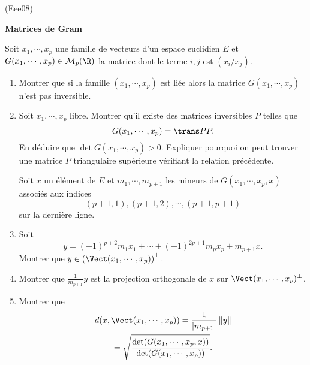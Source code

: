 \begin{tiny}(Eee08)\end{tiny}
\textbf{Matrices de Gram} \par \noindent
Soit $x_{1},\cdots ,x_{p}$ une famille de vecteurs d'un espace euclidien $E$
et $G(x_{1},\cdots ,x_{p})\in \mathcal{M}_{p}(\R)$ la matrice dont
le terme $i,j$ est $(x_{i}/ x_{j})$.
\begin{enumerate}
\item  Montrer que si la famille $(x_{1},\cdots ,x_{p})$ est li{\'e}e alors la matrice  $G(x_{1},\cdots ,x_{p})$ n'est pas inversible.

\item Soit $x_{1},\cdots ,x_{p}$ libre. Montrer qu'il existe des matrices inversibles $P$ telles que
\[
G(x_{1},\cdots ,x_{p}) = \trans P P.
\]
En déduire que $\det G(x_{1},\cdots ,x_{p})>0$. Expliquer pourquoi on peut trouver une matrice $P$ triangulaire supérieure vérifiant la relation précédente.

Soit $x$ un {\'e}l{\'e}ment de $E$ et $m_{1},\cdots ,m_{p+1}$ les mineurs de $G(x_{1},\cdots ,x_{p},x)$ associ{\'e}s aux indices $$(p+1,1),(p+1,2),\cdots ,(p+1,p+1)$$ sur la derni{\`e}re ligne.
\item  Soit 
\[
y=(-1)^{p+2}m_{1}x_{1}+\cdots +(-1)^{2p+1}m_{p}x_{p}+m_{p+1}x.
\]
Montrer que $y\in \left( \Vect(x_{1},\cdots ,x_{p})\right) ^{\perp }$.

\item  Montrer que $\frac{1}{m_{p+1}}y$ est la projection orthogonale de $x$ sur $\Vect(x_{1},\cdots ,x_{p})^{\perp }$.

\item  Montrer que
\begin{multline*}
d(x,\Vect(x_{1},\cdots ,x_{p}))=\frac{1}{\left| m_{p+1}\right| }\left\|y\right\| \\
=\sqrt{\frac{\det (G(x_{1},\cdots ,x_{p},x))}{\det (G(x_{1},\cdots,x_{p}))}}.
\end{multline*}

\end{enumerate}
